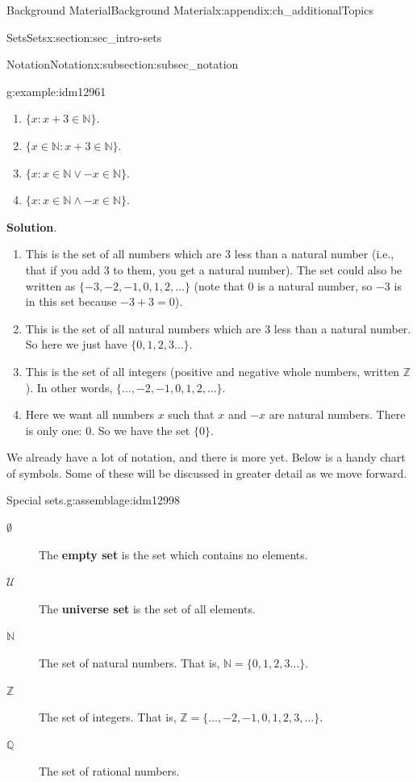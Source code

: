 \documentclass[oneside,10pt,]{book}
\newcommand{\terminology}[1]{\textbf{#1}}
\numberwithin{equation}{chapter}
\def\N{\mathbb N}
\def\Z{\mathbb Z}
\def\Q{\mathbb Q}
\def\U{\mathcal U}
\def\st{:}
\begin{document}
\begin{appendixptx}{Background Material}{}{Background Material}{}{}{x:appendix:ch_additionalTopics}
\begin{sectionptx}{Sets}{}{Sets}{}{}{x:section:sec_intro-sets}
\begin{subsectionptx}{Notation}{}{Notation}{}{}{x:subsection:subsec_notation}
\begin{example}{}{g:example:idm12961}
\begin{enumerate}
\item{}\(\{x \st x + 3 \in \N\}\).%
\item{}\(\{x \in \N \st x + 3 \in \N\}\).%
\item{}\(\{x \st x \in \N \vee -x \in \N\}\).%
\item{}\(\{x \st x \in \N \wedge -x \in \N\}\).%
\end{enumerate}
%
\par\smallskip%
\noindent\textbf{Solution}.\hypertarget{g:solution:idm12974}{}\quad{}%
\begin{enumerate}
\item{}This is the set of all numbers which are 3 less than a natural number (i.e., that if you add 3 to them, you get a natural number). The set could also be written as \(\{-3, -2, -1, 0, 1, 2, \ldots\}\) (note that 0 is a natural number, so \(-3\) is in this set because \(-3 + 3 = 0\)).%
\item{}This is the set of all natural numbers which are 3 less than a natural number. So here we just have \(\{0, 1, 2,3 \ldots\}\).%
\item{}This is the set of all integers  (positive and negative whole numbers, written \(\Z\)). In other words, \(\{\ldots, -2, -1, 0, 1, 2, \ldots\}\).%
\item{}Here we want all numbers \(x\) such that \(x\) and \(-x\) are natural numbers. There is only one: 0. So we have the set \(\{0\}\).%
\end{enumerate}
%
\end{example}
We already have a lot of notation, and there is more yet. Below is a handy chart of symbols. Some of these will be discussed in greater detail as we move forward.%
\begin{assemblage}{Special sets.}{g:assemblage:idm12998}%
%
\begin{description}
\item[{\(\emptyset\)}]The \terminology{empty set} is the set which contains no elements. \label{g:notation:idm13007}  %
\item[{\(\U\)}]The \terminology{universe set} is the set of all elements. \label{g:notation:idm13017}%
\item[{\(\N\)}]The set of natural numbers. That is, \(\N =
\{0, 1, 2, 3\ldots\}\).\label{g:notation:idm13025} %
\item[{\(\Z\)}]The set of integers. That is, \(\Z = \{\ldots, -2, -1, 0, 1, 2, 3, \ldots\}\).  \label{g:notation:idm13037}%
\item[{\(\Q\)}]The set of rational numbers.  \label{g:notation:idm13044} %

\end{description}
\end{assemblage}
\end{subsectionptx}
\end{sectionptx}
\end{appendixptx}
\end{document}
